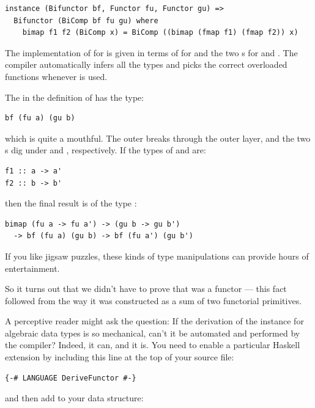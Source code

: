 \begin{Verbatim}[commandchars=\\\{\}]
instance (Bifunctor bf, Functor fu, Functor gu) =>
  Bifunctor (BiComp bf fu gu) where
    bimap f1 f2 (BiComp x) = BiComp ((bimap (fmap f1) (fmap f2)) x) 
\end{Verbatim}
The implementation of  for  is given in
terms of  for  and the two s for
 and . The compiler automatically infers all the
types and picks the correct overloaded functions whenever
 is used.

The  in the definition of  has the type:

\begin{Verbatim}[commandchars=\\\{\}]
bf (fu a) (gu b)
\end{Verbatim}
which is quite a mouthful. The outer  breaks through the
outer  layer, and the two s dig under
 and , respectively. If the types of 
and  are:

\begin{Verbatim}[commandchars=\\\{\}]
f1 :: a -> a'
f2 :: b -> b'
\end{Verbatim}
then the final result is of the type
:

\begin{Verbatim}[commandchars=\\\{\}]
bimap (fu a -> fu a') -> (gu b -> gu b')
  -> bf (fu a) (gu b) -> bf (fu a') (gu b')
\end{Verbatim}
If you like jigsaw puzzles, these kinds of type manipulations can
provide hours of entertainment.

So it turns out that we didn't have to prove that  was a
functor --- this fact followed from the way it was constructed as a sum
of two functorial primitives.

A perceptive reader might ask the question: If the derivation of the
 instance for algebraic data types is so mechanical,
can't it be automated and performed by the compiler? Indeed, it can, and
it is. You need to enable a particular Haskell extension by including
this line at the top of your source file:

\begin{Verbatim}[commandchars=\\\{\}]
{-# LANGUAGE DeriveFunctor #-}
\end{Verbatim}
and then add  to your data structure:

